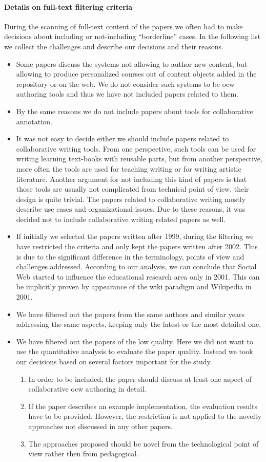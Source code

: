 \documentclass[PhD, Submit, ngerman,UKenglish,table]{scrbook}
\begin{document}
\paragraph{Details on full-text filtering criteria}
During the scanning of full-text content of the papers we often had to make decisions about including or not-including ``borderline'' cases.
In the following list we collect the challenges and describe our decisions and their reasons.
\begin{itemize}
\item Some papers discuss the systems not allowing to author new content, but allowing to produce personalized courses out of content objects added in the repository or on the web.
We do not consider such systems to be \gls{ocw} authoring tools and thus we have not included papers related to them.
\item By the same reasons we do not include papers about tools for collaborative annotation.
\item It was not easy to decide either we should include papers related to collaborative writing tools.
From one perspective, such tools can be used for writing learning text-books with reusable parts, but from another perspective, more often the tools are used for teaching writing or for writing artistic literature.
Another argument for not including this kind of papers is that those tools are usually not complicated from technical point of view, their design is quite trivial. 
The papers related to collaborative writing mostly describe use cases and organizational issues. 
Due to these reasons, it was decided not to include collaborative writing related papers as well.
\item If initially we selected the papers written after 1999, during the filtering we have restricted the criteria and only kept the papers written after 2002.
This is due to the significant difference in the terminology, points of view and challenges addressed.
According to our analysis, we can conclude that Social Web started to influence the educational research area only in 2001. 
This can be implicitly proven by appearance of the wiki paradigm and Wikipedia in 2001.
\item We have filtered out the papers from the same authors and similar years addressing the same aspects, keeping only the latest or the most detailed one. 
\item We have filtered out the papers of the low quality.
Here we did not want to use the quantitative analysis to evaluate the paper quality.
Instead we took our decisions based on several factors important for the study.
\begin{enumerate}
\item In order to be included, the paper should discuss at least one aspect of collaborative \gls{ocw} authoring in detail.
\item If the paper describes an example implementation, the evaluation results have to be provided.
However, the restriction is not applied to the novelty approaches not discussed in any other papers.
\item The approaches proposed should be novel from the technological point of view rather then from pedagogical.
\end{enumerate}


\end{itemize}
\end{document}
